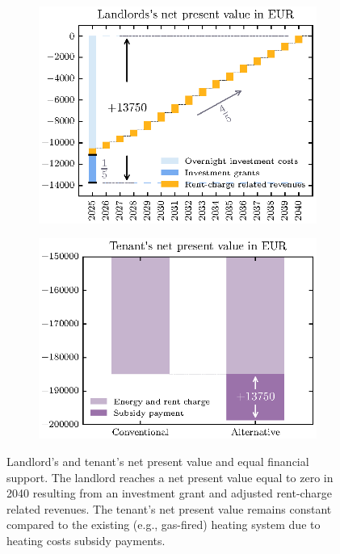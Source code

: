 \begin{figure}[h]
	\begin{subfigure}[c]{0.5\textwidth}
		\centering
		\includegraphics[width=1\linewidth]{figures/3_Methodology/Validate-Landlord.eps}
		\label{fig:landlord}
	\end{subfigure}
	\begin{subfigure}[c]{0.5\textwidth}
		\centering
		\includegraphics[width=1\linewidth]{figures/3_Methodology/Validate-Tenant.eps}
		\label{fig:tenant}
	\end{subfigure}
	\caption{Landlord's and tenant's net present value and equal financial support. The landlord reaches a net present value equal to zero in 2040 resulting from an investment grant and adjusted rent-charge related revenues. The tenant's net present value remains constant compared to the existing (e.g., gas-fired) heating system due to heating costs subsidy payments.}
	\label{val:npv}
\end{figure}

